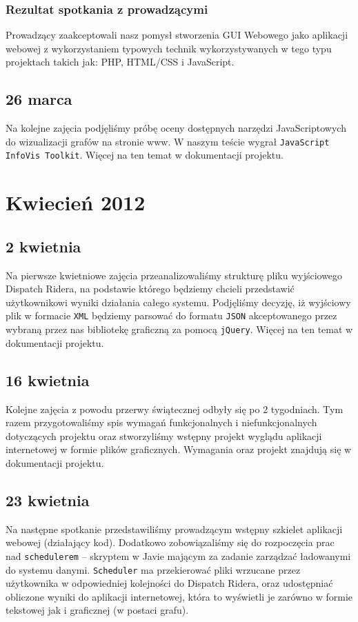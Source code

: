 \subsubsection{Rezultat spotkania z prowadzącymi}
Prowadzący zaakceptowali nasz pomysł stworzenia GUI Webowego jako aplikacji webowej z wykorzystaniem typowych technik wykorzystywanych
w tego typu projektach takich jak: PHP, HTML/CSS i JavaScript.

\subsection{26 marca}
Na kolejne zajęcia podjęliśmy próbę oceny dostępnych narzędzi JavaScriptowych do wizualizacji grafów na stronie www.
W naszym teście wygrał \texttt{JavaScript InfoVis Toolkit}. Więcej na ten temat w dokumentacji projektu.


\section{Kwiecień 2012}
\subsection{2 kwietnia}
Na pierwsze kwietniowe zajęcia przeanalizowaliśmy strukturę pliku wyjściowego Dispatch Ridera, na podstawie którego będziemy
chcieli przedstawić użytkownikowi wyniki działania całego systemu. Podjęliśmy decyzję, iż wyjściowy plik w formacie \texttt{XML}
będziemy parsować do formatu \texttt{JSON} akceptowanego przez wybraną przez nas bibliotekę graficzną za pomocą \texttt{jQuery}.
Więcej na ten temat w dokumentacji projektu.

\subsection{16 kwietnia}
Kolejne zajęcia z powodu przerwy świątecznej odbyły się po 2 tygodniach. Tym razem przygotowaliśmy spis wymagań
funkcjonalnych i niefunkcjonalnych dotyczących projektu oraz stworzyliśmy wstępny projekt wyglądu aplikacji internetowej
w formie plików graficznych. Wymagania oraz projekt znajdują się w dokumentacji projektu.

\subsection{23 kwietnia}
Na następne spotkanie przedstawiliśmy prowadzącym wstępny szkielet aplikacji webowej (działający kod). Dodatkowo zobowiązaliśmy się
do rozpoczęcia prac nad \texttt{schedulerem} -- skryptem w Javie mającym za zadanie zarządzać ładowanymi do systemu danymi.
\texttt{Scheduler} ma przekierować pliki wrzucane przez użytkownika w odpowiedniej kolejności do Dispatch Ridera, oraz udostępniać
obliczone wyniki do aplikacji internetowej, która to wyświetli je zarówno w formie tekstowej jak i graficznej (w postaci grafu).

